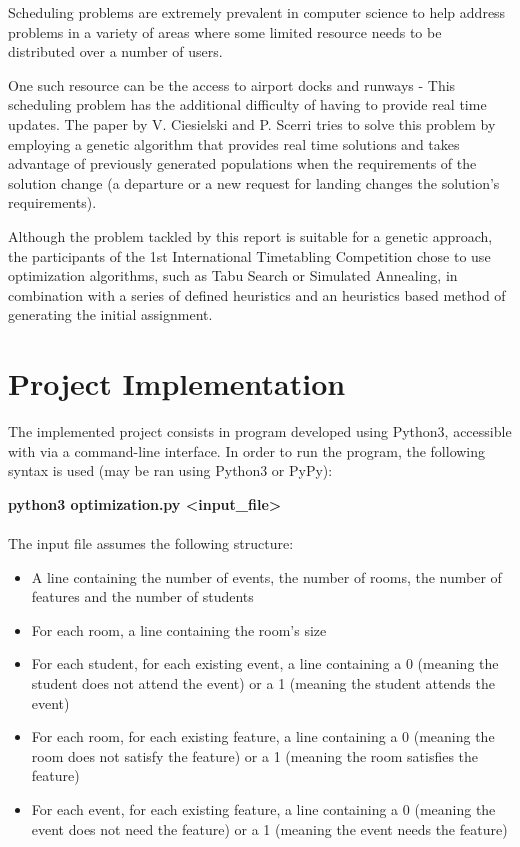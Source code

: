 \documentclass[conference]{IEEEtran}
\begin{document}
Scheduling problems are extremely prevalent in computer science to help address problems in a variety of areas where some limited resource needs to be distributed over a number of users.

One such resource can be the access to airport docks and runways - This scheduling problem has the additional difficulty of having to provide real time updates. The paper by V. Ciesielski and P. Scerri \cite{air} tries to solve this problem by employing a genetic algorithm that provides real time solutions and takes advantage of previously generated populations when the requirements of the solution change (a departure or a new request for landing changes the solution's requirements).

Although the problem tackled by this report is suitable for a genetic approach, the participants of the 1st International Timetabling Competition chose to use optimization algorithms, such as Tabu Search \cite{sol2} or Simulated Annealing\cite{sol1}, in combination with a series of defined heuristics and an heuristics based method of generating the initial assignment. 

\section{Project Implementation}

The implemented project consists in program developed using Python3, accessible with via a command-line interface. In order to run the program, the following syntax is used (may be ran using Python3 or PyPy):

\textbf{python3 optimization.py \textless input\_file\textgreater}
\\\\
The input file assumes the following structure:
\begin{itemize}
    \item A line containing the number of events, the number of rooms, the number of features and the number of students
    \item For each room, a line containing the room's size
    \item For each student, for each existing event, a line containing a 0 (meaning the student does not attend the event) or a 1 (meaning the student attends the event)
    \item For each room, for each existing feature, a line containing a 0 (meaning the room does not satisfy the feature) or a 1 (meaning the room satisfies the feature)
    \item For each event, for each existing feature, a line containing a 0 (meaning the event does not need the feature) or a 1 (meaning the event needs the feature)
\end{itemize}
\end{document}
